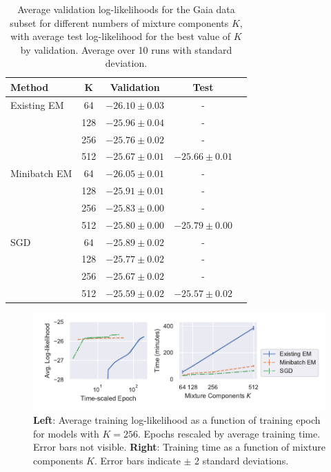 \documentclass{article}
\begin{document}
\begin{table}{}
  \caption{Average validation log-likelihoods for the Gaia data subset for different numbers of mixture components $K$, with average test log-likelihood for the best value of $K$ by validation. Average over 10 runs with standard deviation.}
  \label{results-table}
  \centering
  \begin{tabular}{lcccc}
      \toprule
      Method     & K &  Validation     & Test\\
      \midrule
      Existing EM & 64 & $-26.10 \pm 0.03$ & - \\
      \citet{bovyExtremeDeconvolutionInferring2011} & 128 & $-25.96 \pm 0.04$ & - \\
       & 256 & $-25.76 \pm 0.02$ & - \\
       & 512 & $-25.67 \pm 0.01$ & $-25.66 \pm 0.01$ \\
      \midrule
      Minibatch EM & 64 & $-26.05 \pm 0.01$ & - \\
       & 128 & $-25.91 \pm 0.01$ & - \\
       & 256 & $-25.83 \pm 0.00$ & - \\
       & 512 & $-25.80 \pm 0.00$ & $-25.79 \pm 0.00$ \\
      \midrule
      SGD & 64 & $-25.89 \pm 0.02$ & - \\
       & 128 & $-25.77 \pm 0.02$ & - \\
       & 256 & $-25.67 \pm 0.02$ & - \\
       & 512 & $-25.59 \pm 0.02$ & $-25.57 \pm 0.02$ \\
      \bottomrule
  \end{tabular}
\end{table}

\begin{figure}
  \centering
  \includegraphics[width=\textwidth]{figures/learning.pdf}
  \caption{\textbf{Left}: Average training log-likelihood as a function of training epoch for models with $K=256$. Epochs rescaled by average training time. Error bars not visible. \textbf{Right}: Training time as a function of mixture components $K$. Error bars indicate $\pm$ 2 standard deviations.}
  \label{fig:training}
\end{figure}
\end{document}
